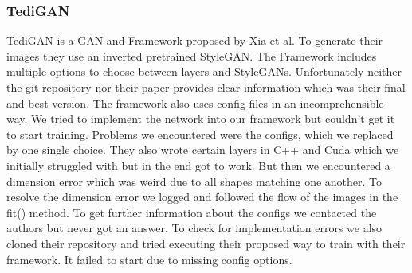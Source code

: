 \documentclass[12pt, a4paper]{article}
\begin{document}
\subsubsection{TediGAN}
\label{tedi}
TediGAN is a GAN and Framework proposed by Xia et al. To generate their images they use an inverted pretrained StyleGAN. The Framework includes multiple options to choose between layers and StyleGANs. 
Unfortunately neither the git-repository nor their paper provides clear information which was their final and best version. The framework also uses config files in an incomprehensible way. We tried to 
implement the network into our framework but couldn't get it to start training. Problems we encountered were the configs, which we replaced by one single choice. They also wrote certain layers in C++ and 
Cuda which we initially struggled with but in the end got to work. But then we encountered a dimension error which was weird due to all shapes matching one another. To resolve the dimension error we 
logged and followed the flow of the images in the fit() method. To get further information about the configs we contacted the authors but never got an answer.
To check for implementation errors we also cloned their repository and tried executing their proposed way to train with their framework. It failed to start due to missing config options.
\end{document}

